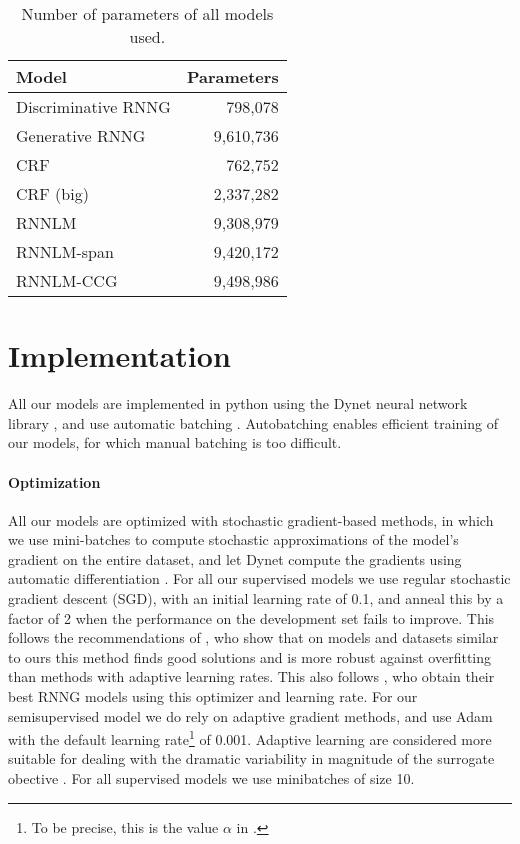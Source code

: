     \begin{table}[h]
    \center
      \begin{tabular}{l|r}
          Model  & Parameters \\ \hline
          Discriminative RNNG & 798,078  \\
          Generative RNNG & 9,610,736  \\
          CRF & 762,752  \\
          CRF (big) & 2,337,282  \\
          RNNLM & 9,308,979 \\
          RNNLM-span & 9,420,172 \\
          RNNLM-CCG & 9,498,986
      \end{tabular}
      \caption{Number of parameters of all models used.}
      \label{tab:num-params}
    \end{table}


\section{Implementation}
  All our models are implemented in python using the Dynet neural network library \citep{neubig2017dynet}, and use automatic batching \citep{neubig2017fly}. Autobatching enables efficient training of our models, for which manual batching is too difficult.

  \paragraph{Optimization}
    All our models are optimized with stochastic gradient-based methods, in which we use mini-batches to compute stochastic approximations of the model's gradient on the entire dataset, and let Dynet compute the gradients using automatic differentiation \citep{neubig2017dynet,baydin2018automatic}. For all our supervised models we use regular stochastic gradient descent (SGD), with an initial learning rate of 0.1, and anneal this by a factor of 2 when the performance on the development set fails to improve. This follows the recommendations of \citet{wilson2017marginal}, who show that on models and datasets similar to ours this method finds good solutions and is more robust against overfitting than methods with adaptive learning rates. This also follows \citet{dyer2016rnng}, who obtain their best RNNG models using this optimizer and learning rate. For our semisupervised model we do rely on adaptive gradient methods, and use Adam \citep{kingma2014adam} with the default learning rate\footnote{To be precise, this is the value $\alpha$ in \citet{kingma2014adam}.} of 0.001. Adaptive learning are considered more suitable for dealing with the dramatic variability in magnitude of the surrogate obective \citep{ranganath2014black,klein2018reinforce}. For all supervised models we use minibatches of size 10.
